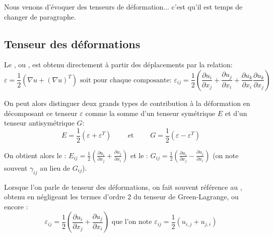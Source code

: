 \medskip
Nous venons d'évoquer des tenseurs de déformation... c'est qu'il est temps de changer de
paragraphe.


\medskip
\subsection{Tenseur des déformations}\label{Sec-TensE}

Le , ou , 
est obtenu directement à partir des déplacements par la relation:
\begin{equation}\varepsilon=\frac12\left(\nabla u+(\nabla u)^T\right)%
\text{ soit pour chaque composante: }
\varepsilon_{ij}=\frac12\left(\frac{\partial u_i}{\partial x_j}+\frac{\partial u_j}{\partial x_i}
+\frac{\partial u_k}{\partial x_i}\frac{\partial u_k}{\partial x_j}
\right)\end{equation}

\medskip
On peut alors distinguer deux grands types de contribution à la déformation en décomposant 
ce tenseur $\varepsilon$ comme la somme d'un tenseur symétrique $E$ et d'un tenseur antisymétrique $G$:
\begin{equation} E=\frac12(\varepsilon+\varepsilon^T) \qquad \text{ et }\qquad G=\frac12(\varepsilon-\varepsilon^T) \end{equation}

On obtient alors le : 
$E_{ij}=\frac12\left(\frac{\partial u_i}{\partial x_j}+\frac{\partial u_j}{\partial x_i}\right)$
et le :
$G_{ij}=\frac12\left(\frac{\partial u_i}{\partial x_j}-\frac{\partial u_j}{\partial x_i}\right)$ (on note
souvent $\gamma_{ij}$ au lieu de $G_{ij}$).

\medskip
Lorsque l'on parle de tenseur des déformations, on fait souvent référence au , obtenu en négligeant 
les termes d'ordre 2 du tenseur de Green-Lagrange, ou encore :
\begin{equation}
\varepsilon_{ij}=\frac12\left(\frac{\partial u_i}{\partial x_j}+\frac{\partial u_j}{\partial x_i}\right)
\text{ que l'on note }
\varepsilon_{ij}=\frac12(u_{i,j}+u_{j,i})
\end{equation}

